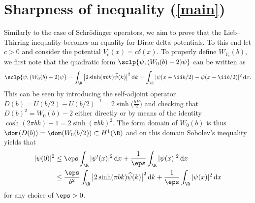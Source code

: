 \section[Sharpness of inequality (1.2)]{Sharpness of inequality (\ref{main})}\label{sec:sharp}

Similarly to the case of Schr\"odinger operators, we aim to prove that the Lieb--Thirring inequality becomes an equality for Dirac-delta potentials. To this end let $c>0$ and consider the potential $V_c(x)=c\delta(x)$. To properly define $W_{V_c}(b)$, we first note that the quadratic form $\sclp{\psi,(W_0(b)-2)\psi}$ can be written as
\begin{gather}
\sclp{\psi,(W_0(b)-2)\psi}=\int_{\R}\big|2\sinh(\pi b k)\widehat{\psi}(k)\big|^2 \, {\rm d} k=\int_{\R}|\psi(x+\ii b/2)-\psi(x-\ii b/2)|^2\, {\rm d} x.
\label{quadratic}
\end{gather}
This can be seen by introducing the self-adjoint operator $D(b)=U(b/2)-U(b/2)^{-1}= 2\sinh\big(\frac{bP}2\big)$ and checking that $D(b)^2=W_0(b)-2$ either directly or by means of the identity $\cosh(2\pi b k)-1\allowbreak=2\sinh(\pi b k)^2$. The form domain of $W_0(b)$ is thus $\dom(D(b))=\dom(W_0(b/2))\subset H^1(\R)$ and on this domain Sobolev's inequality yields that
\begin{align*}
|\psi(0)|^2&\le \eps\int_{\R}|\psi'(x)|^2 \, {\rm d} x+\frac1\eps\int_{\R}|\psi(x)|^2\, {\rm d} x\\
&\le\frac{\eps}{b^2}\int_{\R}\big|2\sinh(\pi b k)\widehat{\psi}(k)\big|^2\, {\rm d} k+\frac1\eps\int_{\R}|\psi(x)|^2\, {\rm d} x
\end{align*}
for any choice of $\eps>0$.
